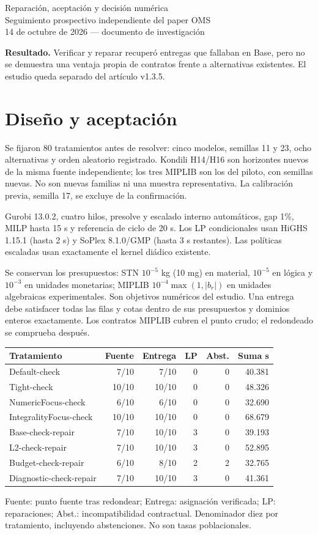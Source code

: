 \documentclass[10pt,a4paper]{article}
\begin{document}
\begin{center}
{\Large Reparación, aceptación y decisión numérica}\\[3pt]
{\large Seguimiento prospectivo independiente del paper OMS}\\[3pt]
14 de octubre de 2026 --- documento de investigación
\end{center}
\textbf{Resultado.} Verificar y reparar recuperó entregas que fallaban en Base,
pero no se demuestra una ventaja propia de contratos frente a alternativas
existentes. El estudio queda separado del artículo v1.3.5.
\section*{Diseño y aceptación}
Se fijaron 80 tratamientos antes de resolver: cinco modelos, semillas 11 y 23,
ocho alternativas y orden aleatorio registrado. Kondili H14/H16 son horizontes
nuevos de la misma fuente independiente; los tres MIPLIB son los del piloto,
con semillas nuevas. No son nuevas familias ni una muestra representativa.
La calibración previa, semilla 17, se excluye de la confirmación.

Gurobi 13.0.2, cuatro hilos, presolve y escalado interno automáticos, gap 1\%,
MILP hasta 15 s y referencia de ciclo de 20 s. Los LP condicionales usan
HiGHS 1.15.1 (hasta 2 s) y SoPlex 8.1.0/GMP (hasta 3 s restantes).
Las políticas escaladas usan exactamente el kernel diádico existente.

Se conservan los presupuestos: STN $10^{-5}$ kg (10 mg) en material,
$10^{-5}$ en lógica y $10^{-3}$ en unidades monetarias; MIPLIB
$10^{-4}\max(1,|b_r|)$ en unidades algebraicas experimentales.
Son objetivos numéricos del estudio. Una entrega debe satisfacer todas las
filas y cotas dentro de sus presupuestos y dominios enteros exactamente.
Los contratos MIPLIB cubren el punto crudo; el redondeado se comprueba después.
\begin{center}\small
\begin{tabular}{@{}lrrrrr@{}}\toprule
Tratamiento & Fuente & Entrega & LP & Abst. & Suma s\\\midrule
Default-check & 7/10 & 7/10 & 0 & 0 & 40.381\\
Tight-check & 10/10 & 10/10 & 0 & 0 & 48.326\\
NumericFocus-check & 6/10 & 6/10 & 0 & 0 & 32.690\\
IntegralityFocus-check & 10/10 & 10/10 & 0 & 0 & 68.679\\
Base-check-repair & 7/10 & 10/10 & 3 & 0 & 39.193\\
L2-check-repair & 7/10 & 10/10 & 3 & 0 & 52.895\\
Budget-check-repair & 6/10 & 8/10 & 2 & 2 & 32.765\\
Diagnostic-check-repair & 7/10 & 10/10 & 3 & 0 & 41.361\\
\bottomrule\end{tabular}\end{center}
Fuente: punto fuente tras redondear; Entrega: asignación verificada; LP:
reparaciones; Abst.: incompatibilidad contractual. Denominador diez por
tratamiento, incluyendo abstenciones. No son tasas poblacionales.
\end{document}
